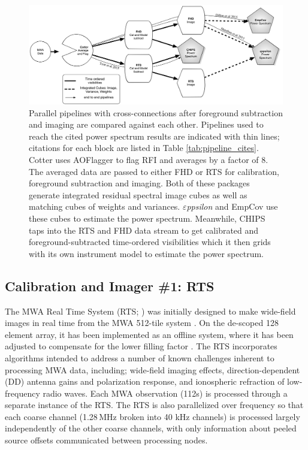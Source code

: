 \documentclass[twolcolumn,iop]{emulateapj}
\def\eppsilon{{\it $\varepsilon$ppsilon}}
\def\empirical{EmpCov}
\begin{document}
\begin{figure}[htbp]
\begin{center}
\includegraphics[width=\textwidth]{figures/MWA_Pipes.png}
\caption{Parallel pipelines with cross-connections after foreground subtraction and imaging are compared against each other. Pipelines used to reach the cited power spectrum results are indicated with thin lines; citations for each block are listed in Table \ref{tab:pipeline_cites}. Cotter uses AOFlagger to flag RFI and averages by a factor of 8. The averaged data are passed to either FHD or RTS for calibration, foreground subtraction and imaging. Both of these packages generate integrated residual spectral image cubes as well as matching cubes of weights and variances.  \eppsilon{} and \empirical{} use these cubes to estimate the power spectrum. Meanwhile, CHIPS taps into the RTS and FHD data stream to get calibrated and foreground-subtracted time-ordered  visibilities which it then grids with its own instrument model to estimate the power spectrum. 
}
\label{fig:pipes}
\end{center}
\end{figure}

\subsection{Calibration and Imager \#1: RTS}
\label{sec:RTS}

The MWA Real Time System (RTS; \cite{Mitchell:2008p707,Ord:2010p8442}) was initially designed to make wide-field images in real time from the MWA 512-tile system \citep{Mitchell:2008p707}.  On the de-scoped 128 element array, it has been implemented as an offline system, where it has been adjusted to compensate for the lower filling factor \citep{Ord:2010p8442}.  The RTS incorporates algorithms intended to address a number of known challenges inherent to processing MWA data, including; wide-field imaging effects, direction-dependent (DD) antenna gains and polarization response, and ionospheric refraction of low-frequency radio waves. Each MWA observation (112s) is processed through a separate instance of the RTS. The RTS is also parallelized over frequency so that each coarse channel (1.28\,MHz broken into 40 kHz channels) is processed largely independently of the other coarse channels, with only information about peeled source offsets communicated between processing nodes.   
\end{document}
